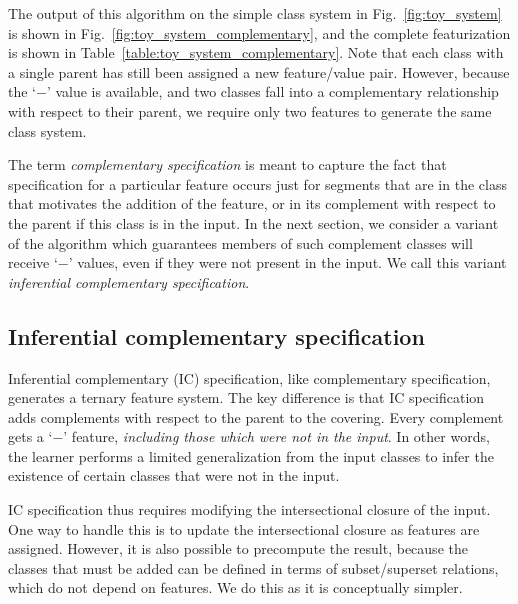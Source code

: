 \documentclass[12pt, oneside]{article}   	%
\begin{document}
The output of this algorithm on the simple class system in Fig.~\ref{fig:toy_system} is shown in Fig.~\ref{fig:toy_system_complementary}, and the complete featurization is shown in Table~\ref{table:toy_system_complementary}. Note that each class with a single parent has still been assigned a new feature/value pair. However, because the `$-$' value is available, and two classes fall into a complementary relationship with respect to their parent, we require only two features to generate the same class system.

The term \textit{complementary specification} is meant to capture the fact that specification for a particular feature occurs just for segments that are in the class that motivates the addition of the feature, or in its complement with respect to the parent if this class is in the input. In the next section, we consider a variant of the algorithm which guarantees members of such complement classes will receive `$-$' values, even if they were not present in the input. We call this variant \textit{inferential complementary specification}.

\FloatBarrier
\subsection{Inferential complementary specification}
\label{sec:contrastive}

Inferential complementary (IC) specification, like complementary specification, generates a ternary feature system. The key difference is that IC specification adds complements with respect to the parent to the covering. Every complement gets a `$-$' feature, \textit{including those which were not in the input}. In other words, the learner performs a limited generalization from the input classes to infer the existence of certain classes that were not in the input.

IC specification thus requires modifying the intersectional closure of the input. One way to handle this is to update the intersectional closure as features are assigned. However, it is also possible to precompute the result, because the classes that must be added can be defined in terms of subset/superset relations, which do not depend on features. We do this as it is conceptually simpler.
\end{document}
